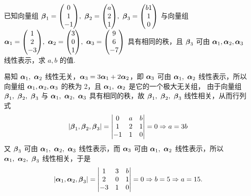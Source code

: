 \begin{example}[2000 数二]
    已知向量组 $\vb*{\beta}_1=\mqty(0\\1\\-1),~\vb*{\beta}_2=\mqty(a\\2\\1),~\vb*{\beta}_3=\mqty(b1\\1\\0)$ 与向量组 $\vb*{\alpha}_1=\mqty(1\\2\\-3),\\~\vb*{\alpha}_2=\mqty(3\\0\\1),~\vb*{\alpha}_3=\mqty(9\\6\\-7)$ 具有相同的秩，且 $\vb*{\beta}_3$ 可由 $\vb*{\alpha}_1,\vb*{\alpha}_2,\vb*{\alpha}_3$ 线性表示，求 $a,b$ 的值.
\end{example}
\begin{solution}
    易知 $\vb*{\alpha}_1,~\vb*{\alpha}_2$ 线性无关，$\vb*{\alpha}_3=3\vb*{\alpha}_1+2\vb*{\alpha}_2$，即 $\vb*{\alpha}_3$ 可由 $\vb*{\alpha}_1,~\vb*{\alpha}_2$ 线性表示，所以向量组 $\vb*{\alpha}_1,\vb*{\alpha}_2,\vb*{\alpha}_3$ 的秩为 2，且 $\vb*{\alpha}_1,~\vb*{\alpha}_2$ 是它的一个极大无关组，
    由于向量组 $\vb*{\beta}_1,~\vb*{\beta}_2,~\vb*{\beta}_3$ 与 $\vb*{\alpha}_1,~\vb*{\alpha}_2,~\vb*{\alpha}_3$ 具有相同的秩，故 $\vb*{\beta}_1,~\vb*{\beta}_2,~\vb*{\beta}_3$ 线性相关，从而行列式 
    $$|\vb*{\beta}_1,\vb*{\beta}_2,\vb*{\beta}_3|=\mqty|0&a&b\\1&2&1\\-1&1&0|=0\Rightarrow a=3b$$
    又 $\vb*{\beta}_3$ 可由 $\vb*{\alpha}_1,~\vb*{\alpha}_2,~\vb*{\alpha}_3$ 线性表示，而 $\vb*{\alpha}_3$ 可由 $\vb*{\alpha}_1,~\vb*{\alpha}_2$ 线性表示，所以 $\vb*{\alpha}_1,~\vb*{\alpha}_2,~\vb*{\beta}_3$ 线性相关，于是 
    $$|\vb*{\alpha}_1,\vb*{\alpha}_2,\vb*{\beta}_3|=\mqty|1&3&b\\2&0&1\\-3&1&0|=0\Rightarrow b=5\Rightarrow a=15.$$
\end{solution}

